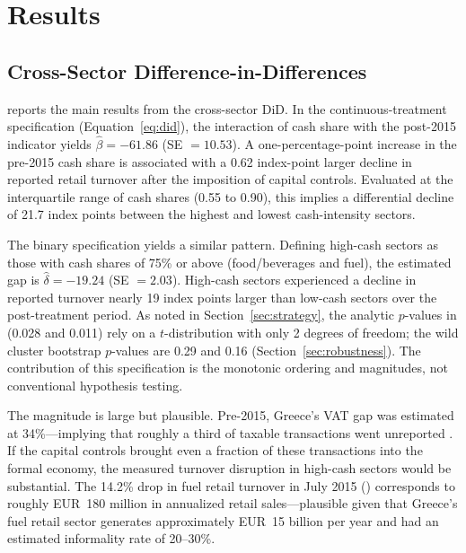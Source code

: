 \documentclass[12pt]{article}
\begin{document}
\section{Results}
\label{sec:results}

\subsection{Cross-Sector Difference-in-Differences}

 reports the main results from the cross-sector DiD. In the continuous-treatment specification (Equation~\ref{eq:did}), the interaction of cash share with the post-2015 indicator yields $\hat{\beta} = -61.86$ (SE $= 10.53$). A one-percentage-point increase in the pre-2015 cash share is associated with a 0.62 index-point larger decline in reported retail turnover after the imposition of capital controls. Evaluated at the interquartile range of cash shares (0.55 to 0.90), this implies a differential decline of 21.7 index points between the highest and lowest cash-intensity sectors.



The binary specification yields a similar pattern. Defining high-cash sectors as those with cash shares of 75\% or above (food/beverages and fuel), the estimated gap is $\hat{\delta} = -19.24$ (SE $= 2.03$). High-cash sectors experienced a decline in reported turnover nearly 19 index points larger than low-cash sectors over the post-treatment period. As noted in Section~\ref{sec:strategy}, the analytic $p$-values in  (0.028 and 0.011) rely on a $t$-distribution with only 2 degrees of freedom; the wild cluster bootstrap $p$-values are 0.29 and 0.16 (Section~\ref{sec:robustness}). The contribution of this specification is the monotonic ordering and magnitudes, not conventional hypothesis testing.

The magnitude is large but plausible. Pre-2015, Greece's VAT gap was estimated at 34\%---implying that roughly a third of taxable transactions went unreported \citep{ecvat2019}. If the capital controls brought even a fraction of these transactions into the formal economy, the measured turnover disruption in high-cash sectors would be substantial. The 14.2\% drop in fuel retail turnover in July 2015 () corresponds to roughly EUR~180 million in annualized retail sales---plausible given that Greece's fuel retail sector generates approximately EUR~15 billion per year and had an estimated informality rate of 20--30\%.
\end{document}
